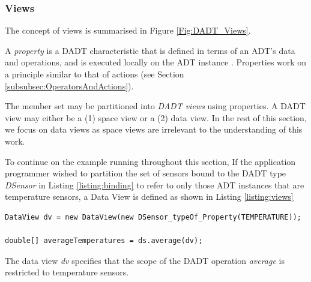 \subsubsection{Views}

The concept of views is summarised in Figure \ref{Fig:DADT_Views}.

A \emph{property} is a DADT characteristic that is defined in terms of an ADT's
data and operations, and is executed locally on the ADT instance
\cite{migliavacca_DADT:2006}. Properties work on a principle similar to that of
actions (see Section \ref{subsubsec:OperatorsAndActions}).

The member set may be partitioned into \emph{DADT views} using properties. A
DADT view may either be a (1) space view or a (2) data view. In the rest of this
section, we focus on data views as space views are irrelevant to the
understanding of this work. 

To continue on the example running throughout this section, If the application
programmer wished to partition the set of sensors bound to the DADT type
\emph{DSensor} in Listing \ref{listing:binding} to refer to only those ADT
instances that are temperature sensors, a Data View is defined as shown in Listing
\ref{listing:views} 
  
\begin{lstlisting}[frame=trbl, basewidth={0.55em, 0.6em}, captionpos=b, 
basicstyle=\ttfamily\footnotesize, breaklines, caption = Definition and use of DADT Data View, label = listing:views ]  
DataView dv = new DataView(new DSensor_typeOf_Property(TEMPERATURE));

double[] averageTemperatures = ds.average(dv);
\end{lstlisting}

The data view \emph{dv} specifies that the scope of the DADT operation
\emph{average} is restricted to temperature sensors.

